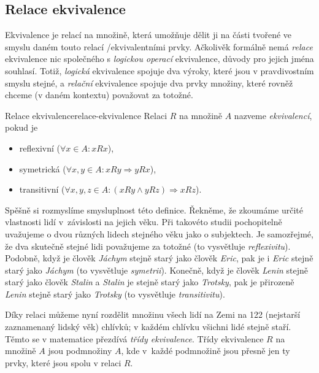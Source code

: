 \subsection{Relace ekvivalence}
\label{ssec:relace-ekvivalence}

Ekvivalence je relací na množině, která umožňuje dělit ji na části tvořené ve
smyslu daném touto relací /ekvivalentními prvky. Ačkolivěk formálně
nemá \emph{relace} ekvivalence nic společného s \emph{logickou operací}
ekvivalence, důvody pro jejich jména souhlasí. Totiž, \emph{logická} ekvivalence
spojuje dva výroky, které jsou v pravdivostním smyslu stejné, a \emph{relační}
ekvivalence spojuje dva prvky množiny, které rovněž chceme (v daném kontextu)
považovat za totožné.

\begin{definition}{Relace ekvivalence}{relace-ekvivalence}
 Relaci $R$ na množině $A$ nazveme \emph{ekvivalencí}, pokud je
 \begin{itemize}
  \item reflexivní ($ \forall x \in A:xRx$),
  \item symetrická ($ \forall x,y \in A:xRy \Rightarrow yRx$),
  \item transitivní ($ \forall x,y,z \in A:(xRy \wedge yRz) \Rightarrow xRz$).
 \end{itemize}
\end{definition}
Spěšně si rozmyslíme smysluplnost této definice. Řekněme, že zkoumáme určité
vlastnosti lidí v~závislosti na jejich věku. Při takovéto studii pochopitelně
uvažujeme o dvou různých lidech stejného věku jako o  subjektech.
Je samozřejmé, že dva skutečně stejné lidi považujeme za totožné (to vysvětluje
\emph{reflexivitu}). Podobně, když je člověk \emph{Jáchym} stejně starý jako
člověk \emph{Eric}, pak je i \emph{Eric} stejně starý jako \emph{Jáchym} (to
vysvětluje \emph{symetrii}). Konečně, když je člověk \emph{Lenin} stejně starý
jako člověk \emph{Stalin} a \emph{Stalin} je stejně starý jako \emph{Trotsky},
pak je přirozeně \emph{Lenin} stejně starý jako \emph{Trotsky} (to vysvětluje
\emph{transitivitu}).

Díky relaci  můžeme nyní rozdělit množinu všech lidí na
Zemi na 122 (nejstarší zaznamenaný lidský věk) chlívků; v každém chlívku všichni
lidé stejně staří. Těmto  se v matematice přezdívá \emph{třídy
ekvivalence}. Třídy ekvivalence $R$ na množině $A$ jsou podmnožiny $A$, kde
v~každé podmnožině jsou přesně jen ty prvky, které jsou spolu v relaci $R$.

